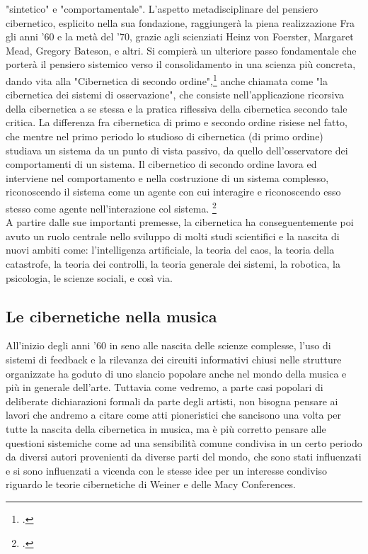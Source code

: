 "sintetico" e "comportamentale".
L'aspetto metadisciplinare del pensiero cibernetico,
esplicito nella sua fondazione, raggiungerà la piena realizzazione
Fra gli anni '60 e la metà del '70, grazie agli scienziati
Heinz von Foerster, Margaret Mead, Gregory Bateson, e altri.
Si compierà un ulteriore passo fondamentale che porterà
il pensiero sistemico verso il consolidamento in una scienza più concreta,
dando vita alla "Cibernetica di secondo ordine",\footcite{wikisecondordercyb}
anche chiamata come "la cibernetica dei sistemi di osservazione",
che consiste nell'applicazione
ricorsiva della cibernetica a se stessa e la pratica riflessiva della cibernetica
secondo tale critica.
La differenza fra cibernetica di primo e secondo ordine risiese nel fatto,
che mentre nel primo periodo lo studioso di cibernetica (di primo ordine)
studiava un sistema da un punto di vista passivo, da quello dell'osservatore
dei comportamenti di un sistema.
Il  cibernetico di secondo ordine lavora ed interviene nel comportamento
e nella costruzione di un sistema complesso,
riconoscendo il sistema come un agente con cui interagire e
riconoscendo esso stesso come agente nell'interazione col sistema.
\footcite{scottsecondordercyb}
\\ A partire dalle sue importanti premesse,
la cibernetica ha conseguentemente poi avuto un ruolo centrale nello sviluppo di
molti studi scientifici e la nascita
di nuovi ambiti come: l'intelligenza artificiale, la teoria del caos,
la teoria della catastrofe,
la teoria dei controlli, la teoria generale dei sistemi, la robotica,
la psicologia, le scienze sociali, e così via.

\subsection{Le cibernetiche nella musica}
\label{sec:Le cibernetiche nella musica}
All'inizio degli anni '60 in seno alle nascita delle scienze complesse,
l'uso di sistemi di feedback e la rilevanza dei circuiti informativi chiusi
nelle strutture organizzate
ha goduto di uno slancio popolare anche nel mondo della musica
e più in generale dell'arte.
Tuttavia come vedremo, a parte casi popolari di deliberate dichiarazioni
formali da parte degli artisti, non bisogna pensare ai lavori che andremo a citare
come atti pioneristici che sancisono una volta per tutte la nascita della cibernetica in musica,
ma è più corretto pensare alle questioni sistemiche come ad una sensibilità
comune condivisa in un certo periodo da diversi autori provenienti da diverse parti del mondo,
che sono stati influenzati e si sono influenzati a vicenda
con le stesse idee per un interesse condiviso riguardo
le teorie cibernetiche di Weiner e delle Macy Conferences.

